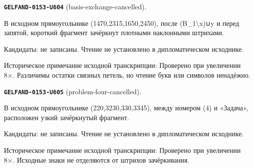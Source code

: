 \par\noindent\leavevmode{}\label{GELFAND-0153-U604}\textbf{\texttt{GELFAND-0153-U604}} (basis-exchange-cancelled).\nopagebreak[4]\par
В исходном прямоугольнике (1470,2315,1650,2450), после (B\_1\textbackslash{}x)∪y и перед запятой, короткий фрагмент зачёркнут плотными наклонными штрихами.\par
Кандидаты: не записаны. Чтение не установлено в дипломатическом исходнике.\par
Историческое примечание исходной транскрипции: Проверено при увеличении 8×. Различимы остатки связных петель, но чтение букв или символов ненадёжно.\par\medskip
\par\noindent\leavevmode{}\label{GELFAND-0153-U605}\textbf{\texttt{GELFAND-0153-U605}} (problem-four-cancelled).\nopagebreak[4]\par
В исходном прямоугольнике (220,3230,330,3345), между номером (4) и «Задача», расположен узкий зачёркнутый фрагмент.\par
Кандидаты: не записаны. Чтение не установлено в дипломатическом исходнике.\par
Историческое примечание исходной транскрипции: Проверено при увеличении 8×. Исходные знаки не отделяются от штрихов зачёркивания.\par\medskip
